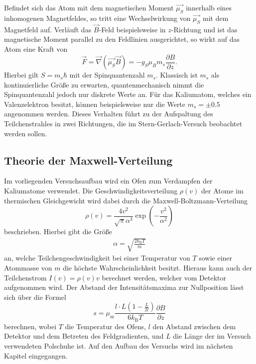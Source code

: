 Befindet sich das Atom mit dem magnetischen Moment $\vec{\mu_S}$ innerhalb eines inhomogenen Magnetfeldes, so tritt eine Wechselwirkung von $\vec{\mu_S}$ mit dem Magnetfeld auf.
Verläuft das $\vec{B}$-Feld beispielsweise in $z$-Richtung und ist das magnetische Moment parallel zu den Feldlinien ausgerichtet, so wirkt auf das Atom eine Kraft von
\begin{equation}
  \vec{F} = \vec{\nabla}\!\left( \vec{\mu_S} \vec{B} \right) = -g_S \mu_B m_s \frac{\partial B}{\partial z}.
\end{equation}
Hierbei gilt $S=m_s \hbar$ mit der Spinquantenzahl $m_s$.
Klassisch ist $m_s$ als kontinuierliche Größe zu erwarten, quantenmechanisch nimmt die Spinquantenzahl jedoch nur diskrete Werte an.
Für das Kaliumatom, welches ein Valenzelektron besitzt, können beispielsweise nur die Werte $m_s = \pm \num{0.5}$ angenommen werden.
Dieses Verhalten führt zu der Aufspaltung des Teilchenstrahles in zwei Richtungen, die im Stern-Gerlach-Versuch beobachtet werden sollen.

\subsection{Theorie der Maxwell-Verteilung}

Im vorliegenden Versuchsaufbau wird ein Ofen zum Verdampfen der Kaliumatome verwendet.
Die Geschwindigkeitsverteilung $\rho(v)$ der Atome im thermischen Gleichgewicht wird dabei durch die Maxwell-Boltzmann-Verteilung
\begin{equation}
  \label{eqn:geschwindigkeit}
  \rho(v) = \frac{4 v^2}{\sqrt{\pi}\alpha^3} \exp{\left(-\frac{v^2}{\alpha^2} \right)}
\end{equation}
beschrieben.
Hierbei gibt die Größe
\begin{align*}
  \alpha = \sqrt{ \frac{2 k_\text{B} T}{m}}
\end{align*}
an, welche Teilchengeschwindigkeit bei einer Temperatur von $T$ sowie einer Atommasse von $m$ die höchste Wahrscheinlichkeit besitzt.
Hieraus kann auch der Teilchenstrom $I(v) = \rho(v) v$ berechnet werden, welcher vom Detektor aufgenommen wird.
Der Abstand der Intensitätsmaxima zur Nullposition lässt sich über die Formel
\begin{equation}
 s = \mu_{\text{sz}}\frac{l\cdot L(1-\frac{L}{2l})}{6k_{\text{B}}T}\frac{\partial B}{\partial z}
\end{equation}
berechnen, wobei $T$ die Temperatur des Ofens, $l$ den Abstand zwischen dem Detektor und dem Betreten des Feldgradienten, und $L$ die Länge der im Versuch verwendeten Polschuhe ist.
Auf den Aufbau des Versuchs wird im nächsten Kapitel eingegangen.
